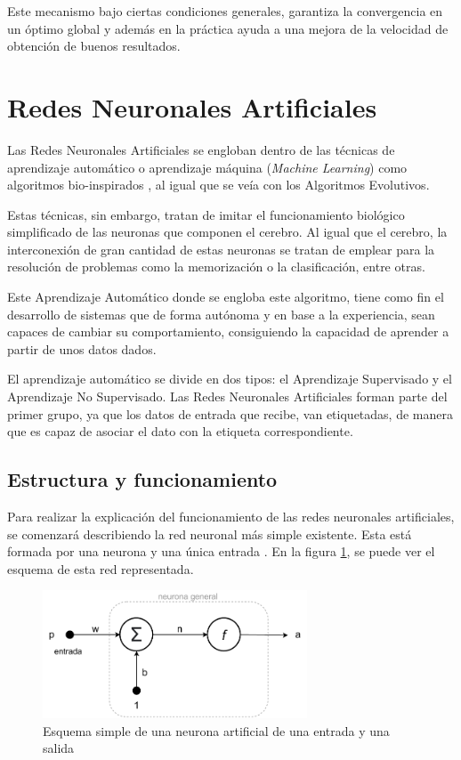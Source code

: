 Este mecanismo bajo ciertas condiciones generales, garantiza la convergencia en un óptimo global y además en la práctica ayuda a una mejora de la velocidad de obtención de buenos resultados.



\section{Redes Neuronales Artificiales}

Las Redes Neuronales Artificiales se engloban dentro de las técnicas de aprendizaje automático o aprendizaje máquina (\textit{Machine Learning}) como algoritmos bio-inspirados \cite{10.5555/523781}, al igual que se veía con los Algoritmos Evolutivos.

Estas técnicas, sin embargo, tratan de imitar el funcionamiento biológico simplificado de las neuronas que componen el cerebro. Al igual que el cerebro, la interconexión de gran cantidad de estas neuronas se tratan de emplear para la resolución de problemas como la memorización o la clasificación, entre otras.

Este Aprendizaje Automático donde se engloba este algoritmo, tiene como fin el desarrollo de sistemas que de forma autónoma y en base a la experiencia, sean capaces de cambiar su comportamiento, consiguiendo la capacidad de aprender a partir de unos datos dados. 

El aprendizaje automático se divide en dos tipos: el Aprendizaje Supervisado y el Aprendizaje No Supervisado. Las Redes Neuronales Artificiales forman parte del primer grupo, ya que los datos de entrada que recibe, van etiquetadas, de manera que es capaz de asociar el dato con la etiqueta correspondiente.

\subsection{Estructura y funcionamiento}

Para realizar la explicación del funcionamiento de las redes neuronales artificiales, se comenzará describiendo la red neuronal más simple existente. Esta está formada por una neurona y una única entrada \cite{10.5555/523781}. En la figura \ref{fig:neurona_simple}, se puede ver el esquema de esta red representada.

\begin{figure}[h]
    \centering
    \includegraphics[width=0.7\textwidth]{figuras/desarrollo teorico/neurona.pdf}
    \caption{Esquema simple de una neurona artificial de una entrada y una salida}
    \label{fig:neurona_simple}
\end{figure}


